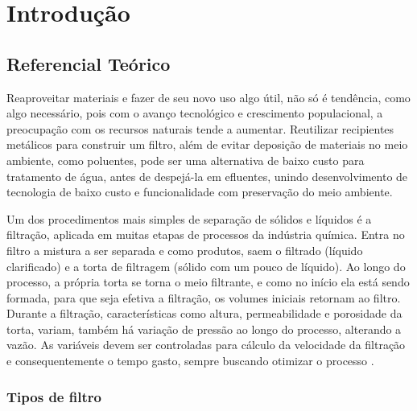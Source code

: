 \chapter{Introdução} \label{sec:intro}

\section{Referencial Teórico}\label{sec:refteo}

Reaproveitar materiais e fazer de seu novo uso algo útil, não só é tendência,
como algo necessário, pois com o avanço tecnológico e crescimento populacional,
a preocupação com os recursos naturais tende a aumentar. Reutilizar recipientes
metálicos para construir um filtro, além de evitar deposição de materiais no
meio ambiente, como poluentes, pode ser uma alternativa de baixo custo para
tratamento de água, antes de despejá-la em efluentes, unindo desenvolvimento de
tecnologia de baixo custo e funcionalidade com preservação do meio ambiente.

Um dos procedimentos mais simples de separação de sólidos e líquidos é a
filtração, aplicada em muitas etapas de processos da indústria química. Entra no
filtro a mistura a ser separada e como produtos, saem o filtrado (líquido
clarificado) e a torta de filtragem (sólido com um pouco de líquido). Ao longo
do processo, a própria torta se torna o meio filtrante, e como no início ela
está sendo formada, para que seja efetiva a filtração, os volumes iniciais
retornam ao filtro. Durante a filtração, características como altura,
permeabilidade e porosidade da torta, variam, também há variação de pressão ao
longo do processo, alterando a vazão. As variáveis devem ser controladas para
cálculo da velocidade da filtração e consequentemente o tempo gasto, sempre
buscando otimizar o processo  .

\subsection{Tipos de filtro}

\label{subsec:tiposdefiltro}


